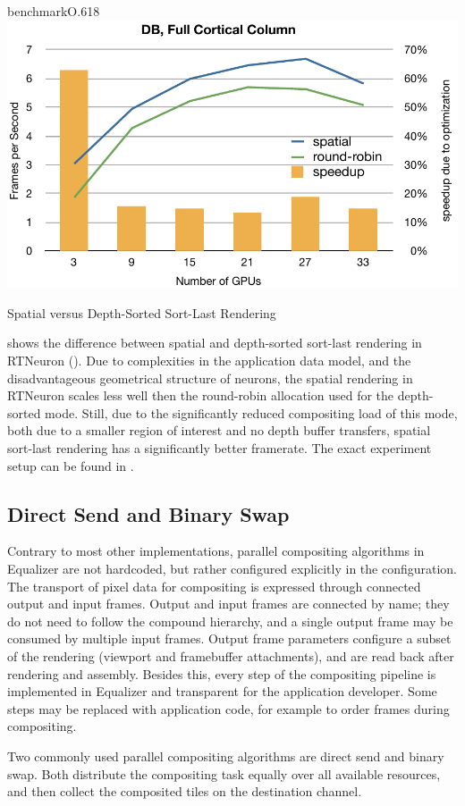 \begin{wrapfloat}{benchmark}{O}{.618\textwidth}
 \includegraphics[width=.618\textwidth]{results/dbSpatial}
 {\caption{\label{rDBSpatial}Spatial versus Depth-Sorted Sort-Last Rendering}}
\end{wrapfloat}

 shows the difference between spatial and depth-sorted
sort-last rendering in RTNeuron (). Due to complexities in the
application data model, and the disadvantageous geometrical structure of
neurons, the spatial rendering in RTNeuron scales less well then the
round-robin allocation used for the depth-sorted mode. Still, due to the
significantly reduced compositing load of this mode, both due to a smaller
region of interest and no depth buffer transfers, spatial sort-last rendering
has a significantly better framerate. The exact experiment setup can be found
in \cite{EBAHMP:12}.

\subsection{Direct Send and Binary Swap}

Contrary to most other implementations, parallel compositing algorithms in
Equalizer are not hardcoded, but rather configured explicitly in the
configuration. The transport of pixel data for compositing is expressed through
connected output and input frames. Output and input frames are connected by
name; they do not need to follow the compound hierarchy, and a single output
frame may be consumed by multiple input frames. Output frame parameters
configure a subset of the rendering (viewport and framebuffer attachments), and
are read back after rendering and assembly. Besides this, every step of the
compositing pipeline is implemented in Equalizer and transparent for the
application developer. Some steps may be replaced with application code, for
example to order frames during compositing.

Two commonly used parallel compositing algorithms are direct send and binary
swap. Both distribute the compositing task equally over all available
resources, and then collect the composited tiles on the destination channel.

